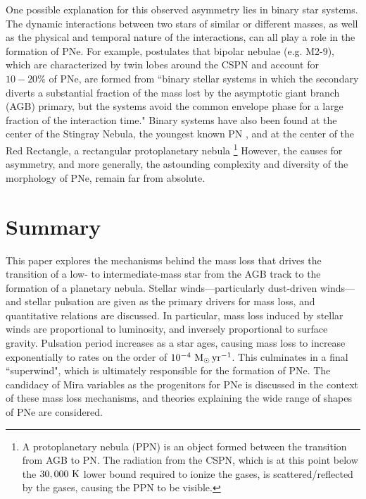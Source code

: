 \documentclass[twocolumn]{aastex63}
\begin{document}
One possible explanation for this observed asymmetry lies in binary star systems. The dynamic interactions between two stars of similar or different masses, as well as the physical and temporal nature of the interactions, can all play a role in the formation of PNe. For example, \cite{soker1998} postulates that bipolar nebulae (e.g. M2-9), which are characterized by twin lobes around the CSPN and account for $10-20\%$ of PNe, are formed from ``binary stellar systems in which the secondary diverts a substantial fraction of the mass lost by the asymptotic giant branch (AGB) primary, but the systems avoid the common envelope phase for a large fraction of the interaction time." Binary systems have also been found at the center of the Stingray Nebula, the youngest known PN \citep{bobrowsky}, and at the center of the Red Rectangle, a rectangular protoplanetary nebula \footnote{A protoplanetary nebula (PPN) is an object formed between the transition from AGB to PN. The radiation from the CSPN, which is at this point below the $30,000~{\rm K}$ lower bound required to ionize the gases, is scattered/reflected by the gases, causing the PPN to be visible.} \citep{cohen} However, the causes for asymmetry, and more generally, the astounding complexity and diversity of the morphology of PNe, remain far from absolute. 


\section{Summary}\label{sec:summary}

This paper explores the mechanisms behind the mass loss that drives the transition of a low- to intermediate-mass star from the AGB track to the formation of a planetary nebula. Stellar winds—particularly dust-driven winds—and stellar pulsation are given as the primary drivers for mass loss, and quantitative relations are discussed. In particular, mass loss induced by stellar winds are proportional to luminosity, and inversely proportional to surface gravity. Pulsation period increases as a star ages, causing mass loss to increase exponentially to rates on the order of $10^{-4}~{\rm M_\odot\,yr^{-1}}$. This culminates in a final ``superwind", which is ultimately responsible for the formation of PNe. The candidacy of Mira variables as the progenitors for PNe is discussed in the context of these mass loss mechanisms, and theories explaining the wide range of shapes of PNe are considered. 



\nocite{*}

\end{document}
